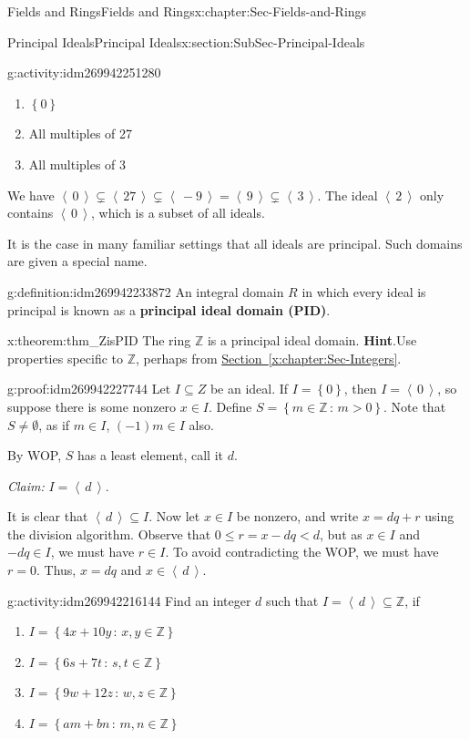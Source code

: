 \documentclass[oneside,10pt,]{book}
\newcommand{\terminology}[1]{\textbf{#1}}
\numberwithin{equation}{section}
\renewcommand{\le}{\leqslant}
\newcommand{\ideal}[1]{\left\langle\, #1 \,\right\rangle}
\newcommand{\set}[1]{\left\{ {#1} \right\}}
\newcommand{\setof}[2]{{\left\{#1\,\colon\,#2\right\}}}
\def\Z{{\mathbb Z}}
\newcommand{\lt}{<}
\begin{document}
\begin{chapterptx}{Fields and Rings}{}{Fields and Rings}{}{}{x:chapter:Sec-Fields-and-Rings}
\begin{sectionptx}{Principal Ideals}{}{Principal Ideals}{}{}{x:section:SubSec-Principal-Ideals}
\begin{activity}{}{g:activity:idm269942251280}
\begin{enumerate}
\item{}\(\set{0}\)%
\item{}All multiples of 27%
\item{}All multiples of 3%
\end{enumerate}
We have \(\ideal{0}\subsetneq \ideal{27}\subsetneq \ideal{-9} = \ideal{9} \subsetneq \ideal{3}\). The ideal \(\ideal{2}\) only contains \(\ideal{0}\), which is a subset of all ideals.%
\end{activity}
It is the case in many familiar settings that all ideals are principal. Such domains are given a special name.%
\begin{definition}{}{g:definition:idm269942233872}%
An integral domain \(R\) in which every ideal is principal is known as a \terminology{principal ideal domain (PID)}.%
\end{definition}
\begin{theorem}{}{}{x:theorem:thm_ZisPID}%
The ring \(\Z\) is a principal ideal domain.%
\textbf{Hint}.\quad{}Use properties specific to \(\Z\), perhaps from \hyperref[x:chapter:Sec-Integers]{Section~\ref{x:chapter:Sec-Integers}}.%
\end{theorem}
\begin{proofptx}{}{g:proof:idm269942227744}
Let \(I\subseteq Z\) be an ideal. If \(I = \set{0}\), then \(I = \ideal{0}\), so suppose there is some nonzero \(x\in I\). Define \(S = \setof{m\in \Z}{m > 0}\). Note that \(S\ne \emptyset\), as if \(m\in I\), \((-1)m \in I\) also.%
\par
By WOP, \(S\) has a least element, call it \(d\).%
\par
\emph{Claim:} \(I = \ideal{d}\).%
\par
It is clear that \(\ideal{d}\subseteq I\). Now let \(x\in I\) be nonzero, and write \(x = dq + r\) using the division algorithm. Observe that \(0 \le r = x - dq \lt d\), but as \(x\in I\) and \(-dq \in I\), we must have \(r\in I\). To avoid contradicting the WOP, we must have \(r = 0\). Thus, \(x = dq\) and \(x\in \ideal{d}\).%
\end{proofptx}
\begin{activity}{}{g:activity:idm269942216144}%
Find an integer \(d\) such that \(I = \ideal{d}\subseteq \Z\), if%
\begin{enumerate}
\item{}\(I = \setof{4x+10y}{x,y\in\Z}\)%
\item{}\(I = \setof{6s+7t}{s,t\in\Z}\)%
\item{}\(I = \setof{9w+12z}{w,z\in\Z}\)%
\item{}\(I = \setof{am+bn}{m,n\in\Z}\)%

\end{enumerate}
\end{activity}
\end{sectionptx}
\end{chapterptx}
\end{document}
